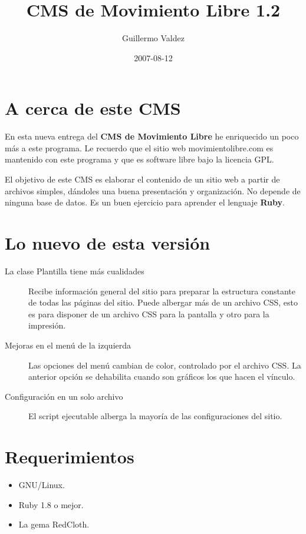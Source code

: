 \documentclass[letterpaper]{article}  %
\title{CMS de Movimiento Libre 1.2}   %
\author{Guillermo Valdez}             %
\date{2007-08-12}                     %
\begin{document}

\maketitle        %

\section{A cerca de este CMS}

En esta nueva entrega del \textbf{CMS de Movimiento Libre} he enriquecido un poco más a este programa. Le recuerdo que el sitio web movimientolibre.com es mantenido con este programa y que es software libre bajo la licencia GPL.\par

El objetivo de este CMS es elaborar el contenido de un sitio web a partir de archivos simples, dándoles una buena presentación y organización. No depende de ninguna base de datos. Es un buen ejercicio para aprender el lenguaje \textbf{Ruby}.\par

\section{Lo nuevo de esta versión}

\begin{description}
	\item[La clase Plantilla tiene más cualidades]
		Recibe información general del sitio para preparar la estructura constante de todas las páginas del sitio.
		Puede albergar más de un archivo CSS, esto es para disponer de un archivo CSS para la pantalla y otro para la impresión.
	\item[Mejoras en el menú de la izquierda]
		Las opciones del menú cambian de color, controlado por el archivo CSS.
		La anterior opción se dehabilita cuando son gráficos los que hacen el vínculo.
	\item[Configuración en un solo archivo]
		El script ejecutable alberga la mayoría de las configuraciones del sitio.
\end{description}

\section{Requerimientos}

\begin{itemize}
	\item GNU/Linux.
	\item Ruby 1.8 o mejor.
	\item La gema RedCloth.
\end{itemize}
\end{document}
